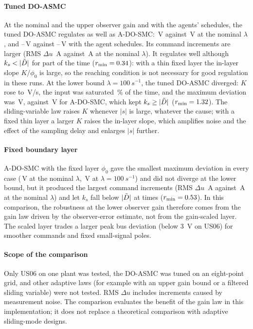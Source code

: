 \paragraph{Tuned DO-ASMC}
At the nominal and the upper observer gain and with the agents' schedules, the tuned DO-ASMC regulates as well as A-DO-SMC: \CmpAsNMax\,V against \CmpANMax\,V at the nominal $\lambda$, and \CmpAsAgMaxLo--\CmpAsAgMaxHi\,V against \CmpAAgMaxLo--\CmpAAgMaxHi\,V with the agent schedules. Its command increments are larger (RMS $\Delta u$ \CmpAsNDu\,A against \CmpANDu\,A at the nominal $\lambda$). It regulates well although $k_s<|\Dt|$ for part of the time ($r_{\min}=0.34$): with a thin fixed layer the in-layer slope $K/\phi_0$ is large, so the reaching condition is not necessary for good regulation in these runs. At the lower bound $\lambda=\SI{100}{s^{-1}}$, the tuned DO-ASMC diverged: $K$ rose to \CmpAsLKs\,V/s, the input was saturated \CmpAsLSat\,\% of the time, and the maximum deviation was \CmpAsLMax\,V, against \CmpALMax\,V for A-DO-SMC, which kept $k_s\ge|\tilde{D}|$ ($r_{\min}=1.32$). The sliding-variable law raises $K$ whenever $|s|$ is large, whatever the cause; with a fixed thin layer a larger $K$ raises the in-layer slope, which amplifies noise and the effect of the sampling delay and enlarges $|s|$ further.

\paragraph{Fixed boundary layer}
A-DO-SMC with the fixed layer $\phi_0$ gave the smallest maximum deviation in every case (\CmpFixNMax\,V at the nominal $\lambda$, \CmpFixLMax\,V at $\lambda=\SI{100}{s^{-1}}$) and did not diverge at the lower bound, but it produced the largest command increments (RMS $\Delta u$ \CmpFixNDu\,A against \CmpANDu\,A at the nominal $\lambda$) and let $k_s$ fall below $|\tilde{D}|$ at times ($r_{\min}=0.53$). In this comparison, the robustness at the lower observer gain therefore comes from the gain law driven by the observer-error estimate, not from the gain-scaled layer. The scaled layer trades a larger peak bus deviation (below \SI{3}{V} on US06) for smoother commands and fixed small-signal poles.

\paragraph{Scope of the comparison}
Only US06 on one plant was tested, the DO-ASMC was tuned on an eight-point grid, and other adaptive laws (for example with an upper gain bound or a filtered sliding variable) were not tested. RMS $\Delta u$ includes increments caused by measurement noise. The comparison evaluates the benefit of the gain law in this implementation; it does not replace a theoretical comparison with adaptive sliding-mode designs.

